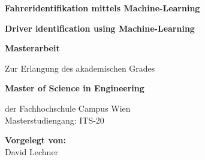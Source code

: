 \begin{center}

\vspace{4.9cm}

\hspace*{-1.0cm} {\LARGE \textbf{Fahreridentifikation mittels Machine-Learning\\}}
\vspace{0.2cm}

\vspace{1cm}

\hspace*{-1.0cm} {\LARGE \textbf{Driver identification using Machine-Learning\\}}
\vspace{0.2cm}

\vspace{2.7cm}

\hspace*{-1.0cm} {\LARGE \textbf{Masterarbeit\\}}

\vspace{0.65cm}

\hspace*{-1.0cm} Zur Erlangung des akademischen Grades \\

\vspace{0.65cm}

\hspace*{-1.0cm} \textbf{Master of Science in Engineering\\}

\vspace{0.65cm}

\hspace*{-1.0cm} der Fachhochschule Campus Wien \\
\vspace{0.2cm}
\hspace*{-1.0cm} Masterstudiengang: ITS-20 \\

\vspace{1.6cm}

\hspace*{-1.0cm} \textbf{Vorgelegt von:} \\
\vspace{0.2cm}
\hspace*{-1.0cm} David Lechner \\

\vspace{0.7cm}


\end{center}
